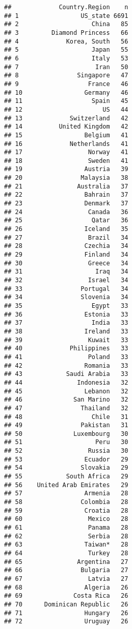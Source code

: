 \documentclass[]{article}
\begin{document}
\begin{verbatim}
##             Country.Region    n
## 1                 US_state 6691
## 2                    China   85
## 3         Diamond Princess   66
## 4             Korea, South   56
## 5                    Japan   55
## 6                    Italy   53
## 7                     Iran   50
## 8                Singapore   47
## 9                   France   46
## 10                 Germany   46
## 11                   Spain   45
## 12                      US   44
## 13             Switzerland   42
## 14          United Kingdom   42
## 15                 Belgium   41
## 16             Netherlands   41
## 17                  Norway   41
## 18                  Sweden   41
## 19                 Austria   39
## 20                Malaysia   38
## 21               Australia   37
## 22                 Bahrain   37
## 23                 Denmark   37
## 24                  Canada   36
## 25                   Qatar   36
## 26                 Iceland   35
## 27                  Brazil   34
## 28                 Czechia   34
## 29                 Finland   34
## 30                  Greece   34
## 31                    Iraq   34
## 32                  Israel   34
## 33                Portugal   34
## 34                Slovenia   34
## 35                   Egypt   33
## 36                 Estonia   33
## 37                   India   33
## 38                 Ireland   33
## 39                  Kuwait   33
## 40             Philippines   33
## 41                  Poland   33
## 42                 Romania   33
## 43            Saudi Arabia   33
## 44               Indonesia   32
## 45                 Lebanon   32
## 46              San Marino   32
## 47                Thailand   32
## 48                   Chile   31
## 49                Pakistan   31
## 50              Luxembourg   30
## 51                    Peru   30
## 52                  Russia   30
## 53                 Ecuador   29
## 54                Slovakia   29
## 55            South Africa   29
## 56    United Arab Emirates   29
## 57                 Armenia   28
## 58                Colombia   28
## 59                 Croatia   28
## 60                  Mexico   28
## 61                  Panama   28
## 62                  Serbia   28
## 63                 Taiwan*   28
## 64                  Turkey   28
## 65               Argentina   27
## 66                Bulgaria   27
## 67                  Latvia   27
## 68                 Algeria   26
## 69              Costa Rica   26
## 70      Dominican Republic   26
## 71                 Hungary   26
## 72                 Uruguay   26

\end{verbatim}
\end{document}
